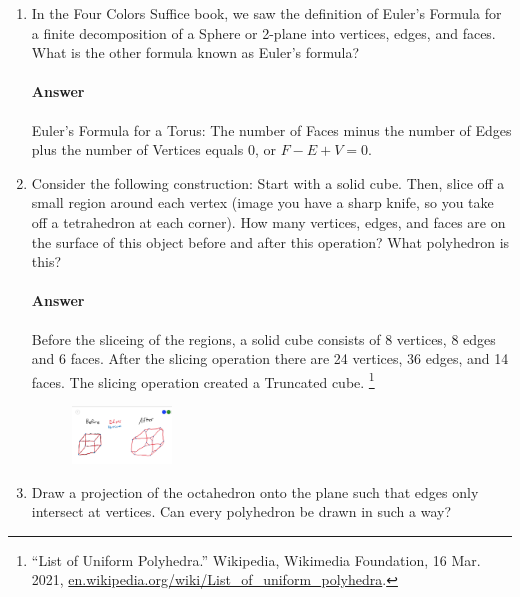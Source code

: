 \documentclass{article}
\begin{document}
\begin{enumerate}

    \item In the Four Colors Suffice book, we saw the definition of Euler's
        Formula for a finite decomposition of a Sphere or 2-plane into vertices,
        edges, and faces.  What is the other formula known as Euler's formula?

        \paragraph{Answer}

        Euler's Formula for a Torus: The number of Faces minus the number of Edges plus the number of Vertices equals 0, or $F-E+V=0$.



    \item  Consider the following construction: Start with a solid cube.  Then, slice
        off a small region around each vertex (image you have a sharp knife, so you take
        off a tetrahedron at each corner).  How many vertices, edges, and faces are on
        the surface of this object before and after this operation? What polyhedron is this?

        \paragraph{Answer}

        Before the sliceing of the regions, a solid cube consists of 8 vertices, 8 edges and 6 faces. After the slicing operation there are 24 vertices, 36 edges, and 14 faces. The slicing operation created a Truncated cube. \footnote{“List of Uniform Polyhedra.” Wikipedia, Wikimedia Foundation, 16 Mar. 2021, \url{en.wikipedia.org/wiki/List_of_uniform_polyhedra}.}


		\begin{figure}[h]
		\centering
			\includegraphics[width=0.25\textwidth]{HW_5_3-2}
		\end{figure}




    \item Draw a projection of the octahedron onto the plane such that edges only
        intersect at vertices.  Can every polyhedron be drawn in such a way?


\end{enumerate}
\end{document}
